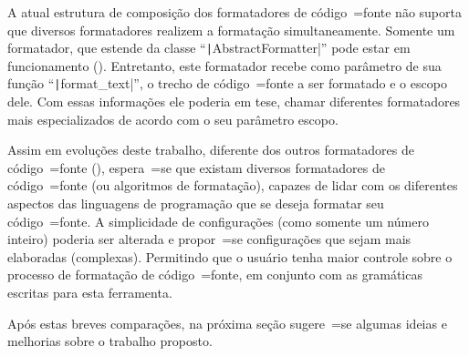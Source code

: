 A atual estrutura de composição dos formatadores de código~=fonte não suporta que diversos formatadores realizem a formatação simultaneamente.
Somente um formatador,
que estende da classe ``\texttt|AbstractFormatter|'' pode estar em funcionamento ().
Entretanto,
este formatador recebe como parâmetro de sua função ``\texttt|format_text|'',
o trecho de código~=fonte a ser formatado e
o escopo dele.
Com essas informações ele poderia em tese,
chamar diferentes formatadores mais especializados de acordo com o seu parâmetro escopo.

Assim em evoluções deste trabalho,
diferente dos outros formatadores de código~=fonte (),
espera~=se que existam diversos formatadores de código~=fonte (ou algoritmos de formatação),
capazes de lidar com os diferentes aspectos das linguagens de programação que se deseja formatar seu código~=fonte.
A simplicidade de configurações (como somente um número inteiro) poderia ser alterada e
propor~=se configurações que sejam mais elaboradas (complexas).
Permitindo que o usuário tenha maior controle sobre o processo de formatação de código~=fonte,
em conjunto com as gramáticas escritas para esta ferramenta.

Após estas breves comparações,
na próxima seção sugere~=se algumas ideias e
melhorias sobre o trabalho proposto.


\section{}
\label{section:trabalhosFuturos}


